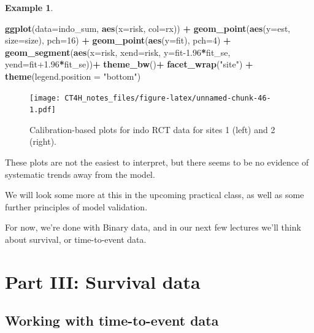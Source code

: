\documentclass[
  openany]{book}
\newenvironment{Shaded}{\begin{snugshade}}{\end{snugshade}}
\newcommand{\AttributeTok}[1]{\textcolor[rgb]{0.13,0.29,0.53}{#1}}
\newcommand{\DecValTok}[1]{\textcolor[rgb]{0.00,0.00,0.81}{#1}}
\newcommand{\FloatTok}[1]{\textcolor[rgb]{0.00,0.00,0.81}{#1}}
\newcommand{\FunctionTok}[1]{\textcolor[rgb]{0.13,0.29,0.53}{\textbf{#1}}}
\newcommand{\NormalTok}[1]{#1}
\newcommand{\SpecialCharTok}[1]{\textcolor[rgb]{0.81,0.36,0.00}{\textbf{#1}}}
\newcommand{\StringTok}[1]{\textcolor[rgb]{0.31,0.60,0.02}{#1}}
\theoremstyle{definition}
\theoremstyle{definition}
\newtheorem{example}{Example}[chapter]
\theoremstyle{definition}
\theoremstyle{definition}
\theoremstyle{remark}
\begin{document}
\begin{example}
\begin{Shaded}
\begin{Highlighting}[]
\FunctionTok{ggplot}\NormalTok{(}\AttributeTok{data=}\NormalTok{indo\_sum, }\FunctionTok{aes}\NormalTok{(}\AttributeTok{x=}\NormalTok{risk, }\AttributeTok{col=}\NormalTok{rx)) }\SpecialCharTok{+}
  \FunctionTok{geom\_point}\NormalTok{(}\FunctionTok{aes}\NormalTok{(}\AttributeTok{y=}\NormalTok{est, }\AttributeTok{size=}\NormalTok{size), }\AttributeTok{pch=}\DecValTok{16}\NormalTok{) }\SpecialCharTok{+} 
  \FunctionTok{geom\_point}\NormalTok{(}\FunctionTok{aes}\NormalTok{(}\AttributeTok{y=}\NormalTok{fit), }\AttributeTok{pch=}\DecValTok{4}\NormalTok{) }\SpecialCharTok{+}
  \FunctionTok{geom\_segment}\NormalTok{(}\FunctionTok{aes}\NormalTok{(}\AttributeTok{x=}\NormalTok{risk, }\AttributeTok{xend=}\NormalTok{risk, }\AttributeTok{y=}\NormalTok{fit}\FloatTok{{-}1.96}\SpecialCharTok{*}\NormalTok{fit\_se, }\AttributeTok{yend=}\NormalTok{fit}\FloatTok{+1.96}\SpecialCharTok{*}\NormalTok{fit\_se))}\SpecialCharTok{+}
  \FunctionTok{theme\_bw}\NormalTok{()}\SpecialCharTok{+}
  \FunctionTok{facet\_wrap}\NormalTok{(}\StringTok{"site"}\NormalTok{) }\SpecialCharTok{+} \FunctionTok{theme}\NormalTok{(}\AttributeTok{legend.position =} \StringTok{"bottom"}\NormalTok{)}
\end{Highlighting}
\end{Shaded}

\begin{figure}
\centering
\texttt{[image: CT4H\_notes\_files/figure-latex/unnamed-chunk-46-1.pdf]}
\caption{\label{fig:unnamed-chunk-46}Calibration-based plots for indo RCT data for sites 1 (left) and 2 (right).}
\end{figure}

These plots are not the easiest to interpret, but there seems to be no evidence of systematic trends away from the model.
\end{example}

We will look some more at this in the upcoming practical class, as well as some further principles of model validation.

For now, we're done with Binary data, and in our next few lectures we'll think about survival, or time-to-event data.

\hypertarget{part-part-iii-survival-data}{%
\part{Part III: Survival data}\label{part-part-iii-survival-data}}

\hypertarget{working-with-time-to-event-data}{%
\chapter{Working with time-to-event data}\label{working-with-time-to-event-data}}
\end{document}

